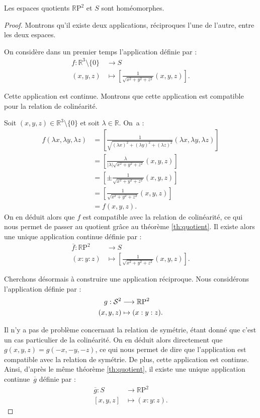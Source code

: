 \documentclass[hidelinks, 10pt]{article}
\begin{document}
\begin{proposition}\label{homeo-RP-S}
Les espaces quotients $\mathbb{R}\mathrm{P}^2$ et $S$ sont homéomorphes.
\end{proposition}
\begin{proof}
Montrons qu'il existe deux applications, réciproques l'une de l'autre, entre les deux espaces.

On considère dans un premier temps l'application définie par : \[\begin{split}
    f:\mathbb{R}^3\!\setminus\!\{0\}&\longrightarrow S\\
    (x,y,z)&\mapsto\left[\frac{1}{\sqrt{x^2+y^2+z^2}}(x,y,z)\right].
\end{split}\]

Cette application est continue. Montrons que cette application est compatible pour la relation de colinéarité.

Soit $(x,y,z)\in\mathbb{R}^3\!\setminus\!\{0\}$ et soit $\lambda\in\mathbb{R}$. On~a :\[\begin{split}
f(\lambda x,\lambda y,\lambda z)&=\left[\frac{1}{\sqrt{(\lambda x)^2+(\lambda y)^2+(\lambda z)^2}}(\lambda x,\lambda y,\lambda z)\right]\\
&=\left[\frac{\lambda}{|\lambda|\sqrt{x^2+y^2+z^2}}(x,y, z)\right]\\
&=\left[\pm\frac{1}{\sqrt{x^2+y^2+z^2}}(x,y,z)\right]\\
&=\left[\frac{1}{\sqrt{x^2+y^2+z^2}}(x,y,z)\right]\\
&=f(x,y,z).
\end{split}\]On en déduit alors que $f$ est compatible avec la relation de colinéarité, ce qui nous permet de passer au quotient grâce au théorème \ref{th:quotient}. Il existe alors une unique application continue définie par : \[\begin{split}
\overline{f}:\mathbb{R}\mathrm{P}^2&\longrightarrow S\\
(x:y:z)&\mapsto\left[\frac{1}{{\sqrt{x^2+y^2+z^2}}}\left(x,y,z\right)\right].
\end{split}\]

Cherchons désormais à construire une application réciproque. Nous considérons l'application définie par : \[\begin{split}
g:\mathcal{S}^{2}&\longrightarrow\mathbb{R}\mathrm{P}^2\\
(x,y,z)&\mapsto(x:y:z).
\end{split}\]

Il n'y a pas de problème concernant la relation de symétrie, étant donné que c'est un cas particulier de la colinéarité. On en déduit alors directement que $g(x,y,z)=g(-x,-y,-z)$, ce qui nous permet de dire que l'application est compatible avec la relation de symétrie. De plus, cette application est continue. Ainsi, d'après le même théorème \ref{th:quotient}, il existe une unique application continue~$\overline{g}$ définie par : \[\begin{split}
\overline{g}:S&\longrightarrow\mathbb{R}\mathrm{P}^2\\
[x,y,z]&\mapsto (x:y:z).
\end{split}\]


\end{proof}
\end{document}
